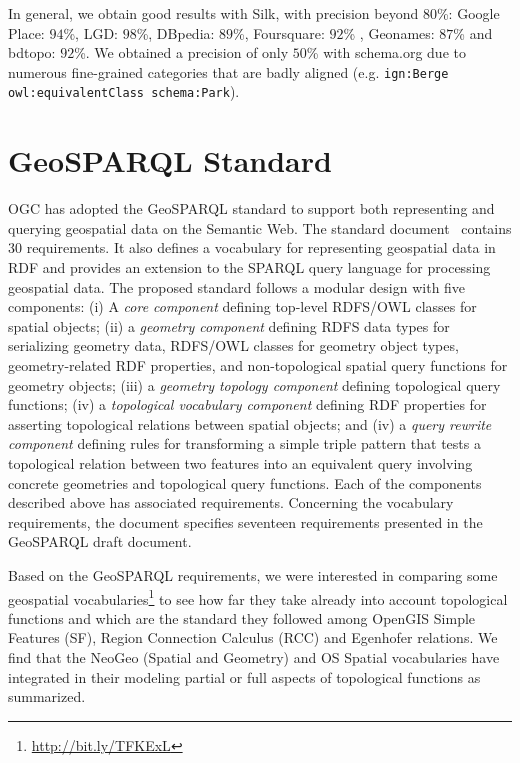 \documentclass[a4paper,11pt]{report}
\begin{document}
In general, we obtain good results with Silk, with precision beyond $80$\%: Google Place: $94$\%, LGD: $98$\%, DBpedia: $89$\%, Foursquare: $92$\% , Geonames: $87$\% and bdtopo: $92$\%. We obtained a precision of only $50$\% with schema.org due to numerous fine-grained categories that are badly aligned (e.g. \texttt{ign:Berge owl:equivalentClass schema:Park}).



\section{GeoSPARQL Standard}
OGC has adopted the GeoSPARQL standard to support both representing and querying geospatial data on the Semantic Web. The standard document~\cite{ogc2012} contains 30 requirements. It also defines a vocabulary for representing geospatial data in RDF and provides an extension to the SPARQL query language for processing geospatial data. The proposed standard follows a modular design with five components: (i) A \textit{core component} defining top-level RDFS/OWL classes for spatial objects; (ii) a \textit{geometry component} defining RDFS data types for serializing geometry data, RDFS/OWL classes for geometry object types, geometry-related RDF properties, and non-topological spatial query functions for geometry objects; (iii) a \textit{geometry topology component} defining topological query functions; (iv) a \textit{topological vocabulary component} defining RDF properties for asserting topological relations between spatial objects; and (iv) a \textit{query rewrite component} defining rules for transforming a simple triple pattern that tests a topological relation between two features into an equivalent query involving concrete geometries and topological query functions. Each of the components described above has associated requirements. Concerning the vocabulary requirements, the document specifies seventeen requirements presented in the GeoSPARQL draft document.


Based on the GeoSPARQL requirements, we were interested in comparing some geospatial vocabularies\footnote{\url{http://bit.ly/TFKExL}} to see how far they take already into account topological functions and which are the standard they followed among OpenGIS Simple Features (SF), Region Connection Calculus (RCC) and Egenhofer relations. We find that the NeoGeo (Spatial and Geometry) and OS Spatial vocabularies have integrated in their modeling partial or full aspects of topological functions as summarized.
\end{document}
